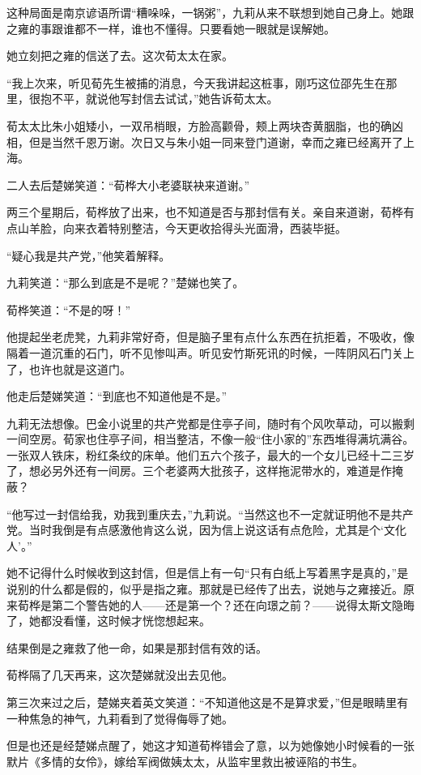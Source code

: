 \par 这种局面是南京谚语所谓“糟哚哚，一锅粥”，九莉从来不联想到她自己身上。她跟之雍的事跟谁都不一样，谁也不懂得。只要看她一眼就是误解她。
\par 她立刻把之雍的信送了去。这次荀太太在家。
\par “我上次来，听见荀先生被捕的消息，今天我讲起这桩事，刚巧这位邵先生在那里，很抱不平，就说他写封信去试试，”她告诉荀太太。
\par 荀太太比朱小姐矮小，一双吊梢眼，方脸高颧骨，颊上两块杏黄胭脂，也的确凶相，但是当然千恩万谢。次日又与朱小姐一同来登门道谢，幸而之雍已经离开了上海。
\par 二人去后楚娣笑道：“荀桦大小老婆联袂来道谢。”
\par 两三个星期后，荀桦放了出来，也不知道是否与那封信有关。亲自来道谢，荀桦有点山羊脸，向来衣着特别整洁，今天更收拾得头光面滑，西装毕挺。
\par “疑心我是共产党，”他笑着解释。
\par 九莉笑道：“那么到底是不是呢？”楚娣也笑了。
\par 荀桦笑道：“不是的呀！”
\par 他提起坐老虎凳，九莉非常好奇，但是脑子里有点什么东西在抗拒着，不吸收，像隔着一道沉重的石门，听不见惨叫声。听见安竹斯死讯的时候，一阵阴风石门关上了，也许也就是这道门。
\par 他走后楚娣笑道：“到底也不知道他是不是。”
\par 九莉无法想像。巴金小说里的共产党都是住亭子间，随时有个风吹草动，可以搬剩一间空房。荀家也住亭子间，相当整洁，不像一般“住小家的”东西堆得满坑满谷。一张双人铁床，粉红条纹的床单。他们五六个孩子，最大的一个女儿已经十二三岁了，想必另外还有一间房。三个老婆两大批孩子，这样拖泥带水的，难道是作掩蔽？
\par “他写过一封信给我，劝我到重庆去，”九莉说。“当然这也不一定就证明他不是共产党。当时我倒是有点感激他肯这么说，因为信上说这话有点危险，尤其是个‘文化人’。”
\par 她不记得什么时候收到这封信，但是信上有一句“只有白纸上写着黑字是真的，”是说别的什么都是假的，似乎是指之雍。那就是已经传了出去，说她与之雍接近。原来荀桦是第二个警告她的人——还是第一个？还在向璟之前？——说得太斯文隐晦了，她都没看懂，这时候才恍惚想起来。
\par 结果倒是之雍救了他一命，如果是那封信有效的话。
\par 荀桦隔了几天再来，这次楚娣就没出去见他。
\par 第三次来过之后，楚娣夹着英文笑道：“不知道他这是不是算求爱，”但是眼睛里有一种焦急的神气，九莉看到了觉得侮辱了她。
\par 但是也还是经楚娣点醒了，她这才知道荀桦错会了意，以为她像她小时候看的一张默片《多情的女伶》，嫁给军阀做姨太太，从监牢里救出被诬陷的书生。
